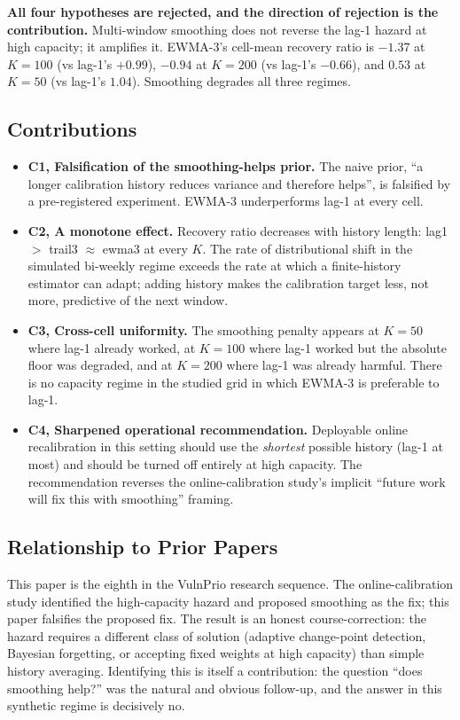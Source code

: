 \textbf{All four hypotheses are rejected, and the direction of
rejection is the contribution.} Multi-window smoothing does not
reverse the lag-1 hazard at high capacity; it amplifies it. EWMA-3's
cell-mean recovery ratio is $-1.37$ at $K = 100$ (vs lag-1's $+0.99$),
$-0.94$ at $K = 200$ (vs lag-1's $-0.66$), and $0.53$ at $K = 50$
(vs lag-1's $1.04$). Smoothing degrades all three regimes.

\subsection{Contributions}

\begin{itemize}
\item \textbf{C1, Falsification of the smoothing-helps prior.} The
naive prior, ``a longer calibration history reduces variance and
therefore helps'', is falsified by a pre-registered experiment.
EWMA-3 underperforms lag-1 at every cell.

\item \textbf{C2, A monotone effect.} Recovery ratio decreases
with history length: \textsf{lag1} $>$ \textsf{trail3} $\approx$
\textsf{ewma3} at every $K$. The rate of distributional shift in
the simulated bi-weekly regime exceeds the rate at which a
finite-history estimator can adapt; adding history makes the
calibration target less, not more, predictive of the next window.

\item \textbf{C3, Cross-cell uniformity.} The smoothing penalty
appears at $K = 50$ where lag-1 already worked, at $K = 100$ where
lag-1 worked but the absolute floor was degraded, and at $K = 200$
where lag-1 was already harmful. There is no capacity regime in
the studied grid in which EWMA-3 is preferable to lag-1.

\item \textbf{C4, Sharpened operational recommendation.} Deployable
online recalibration in this setting should use the \textit{shortest}
possible history (lag-1 at most) and should be turned off entirely
at high capacity. The recommendation reverses the online-calibration study's implicit
``future work will fix this with smoothing'' framing.
\end{itemize}

\subsection{Relationship to Prior Papers}

This paper is the eighth in the VulnPrio research sequence. The online-calibration study
identified the high-capacity hazard and proposed smoothing as the
fix; this paper falsifies the proposed fix. The result is an
honest course-correction: the hazard requires a different class of
solution (adaptive change-point detection, Bayesian forgetting,
or accepting fixed weights at high capacity) than simple history
averaging. Identifying this is itself a contribution: the question
``does smoothing help?'' was the natural and obvious follow-up,
and the answer in this synthetic regime is decisively no.
